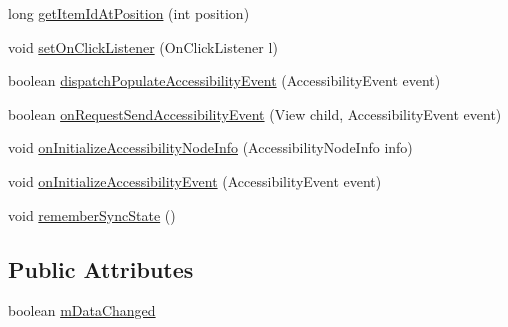 \begin{DoxyCompactItemize}
\item 
long \hyperlink{classit_1_1sephiroth_1_1android_1_1library_1_1widget_1_1_adapter_view_a8db15c5d1782366d1439f73f1a3d9e13}{get\+Item\+Id\+At\+Position} (int position)
\item 
void \hyperlink{classit_1_1sephiroth_1_1android_1_1library_1_1widget_1_1_adapter_view_a1f127ae55481ec004b831e805f191a18}{set\+On\+Click\+Listener} (On\+Click\+Listener l)
\item 
boolean \hyperlink{classit_1_1sephiroth_1_1android_1_1library_1_1widget_1_1_adapter_view_ad70b73ce9a9b86b4d582ceedee2d49b8}{dispatch\+Populate\+Accessibility\+Event} (Accessibility\+Event event)
\item 
boolean \hyperlink{classit_1_1sephiroth_1_1android_1_1library_1_1widget_1_1_adapter_view_aca9fa9c61cae4d4bd18f248a9c67ca59}{on\+Request\+Send\+Accessibility\+Event} (View child, Accessibility\+Event event)
\item 
void \hyperlink{classit_1_1sephiroth_1_1android_1_1library_1_1widget_1_1_adapter_view_a7a7505089a691a48eef943d585403979}{on\+Initialize\+Accessibility\+Node\+Info} (Accessibility\+Node\+Info info)
\item 
void \hyperlink{classit_1_1sephiroth_1_1android_1_1library_1_1widget_1_1_adapter_view_a8dfe8907b1b0289cb254dd3daeabe28a}{on\+Initialize\+Accessibility\+Event} (Accessibility\+Event event)
\item 
void \hyperlink{classit_1_1sephiroth_1_1android_1_1library_1_1widget_1_1_adapter_view_a0a502d79d66efe01487472fd32e45ee9}{remember\+Sync\+State} ()
\end{DoxyCompactItemize}
\subsection*{Public Attributes}
\begin{DoxyCompactItemize}
\item 
boolean \hyperlink{classit_1_1sephiroth_1_1android_1_1library_1_1widget_1_1_adapter_view_ab904de77928fa7863ad0c3c5abb7f994}{m\+Data\+Changed}
\end{DoxyCompactItemize}
